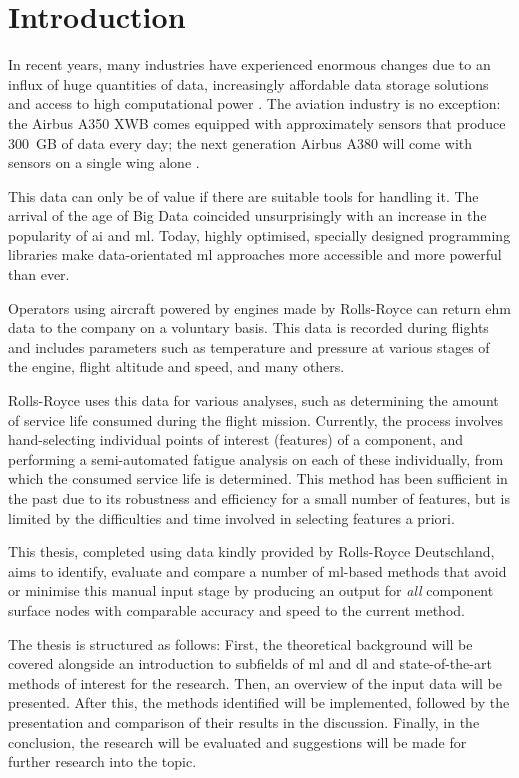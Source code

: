 \chapter{Introduction}
In recent years, many industries have experienced enormous changes due to an influx of huge quantities of data, increasingly affordable data storage solutions and access to high computational power \cite[]{chen_big_2014}. The aviation industry is no exception: the Airbus A350 XWB comes equipped with approximately  sensors that produce \mbox{300 GB} of data every day; the next generation Airbus A380 will come with  sensors on a single wing alone \cite[]{rajaraman_big_2016}.

This data can only be of value if there are suitable tools for handling it. The arrival of the age of Big Data \cite[]{fan_mining_2013} coincided unsurprisingly with an increase in the popularity of \ac{ai} and \ac{ml}. Today, highly optimised, specially designed programming libraries make data-orientated \ac{ml} approaches more accessible and more powerful than ever.

Operators using aircraft powered by engines made by Rolls-Royce can return \ac{ehm} data to the company on a voluntary basis. This data is recorded during flights and includes parameters such as temperature and pressure at various stages of the engine, flight altitude and speed, and many others.

Rolls-Royce uses this data for various analyses, such as determining the amount of service life consumed during the flight mission. Currently, the process involves hand-selecting individual points of interest (features) of a component, and performing a semi-automated fatigue analysis on each of these individually, from which the consumed service life is determined. This method has been sufficient in the past due to its robustness and efficiency for a small number of features, but is limited by the difficulties and time involved in selecting features a priori.

This thesis, completed using data kindly provided by Rolls-Royce Deutschland, aims to identify, evaluate and compare a number of \ac{ml}-based methods that avoid or minimise this manual input stage by producing an output for \textit{all} component surface nodes with comparable accuracy and speed to the current method.

The thesis is structured as follows: First, the theoretical background will be covered alongside an introduction to subfields of \ac{ml} and \ac{dl} and state-of-the-art methods of interest for the research. Then, an overview of the input data will be presented. After this, the methods identified will be implemented, followed by the presentation and comparison of their results in the discussion. Finally, in the conclusion, the research will be evaluated and suggestions will be made for further research into the topic.
